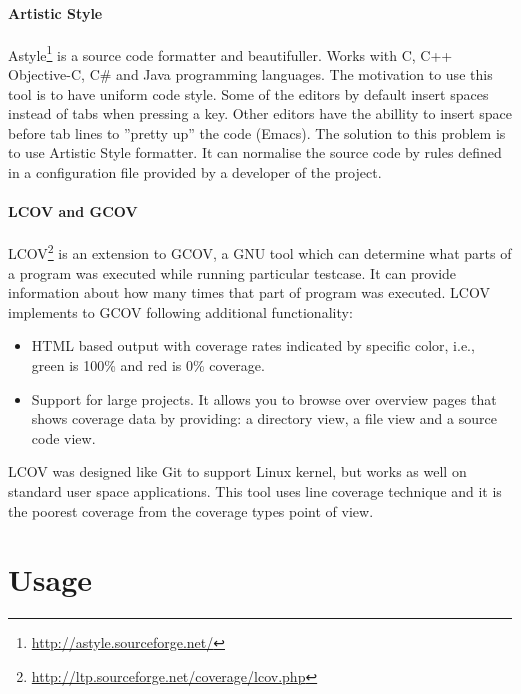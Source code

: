 \paragraph{Artistic Style}
Astyle\footnote{\url{http://astyle.sourceforge.net/}} is a source code formatter and beautifuller.
Works with C, C++ Objective-C, C\# and Java programming languages.
The motivation to use this tool is to have uniform code style.
Some of the editors by default insert spaces instead of tabs when pressing a key.
Other editors have the abillity to insert space before tab lines to ''pretty up'' the code (Emacs).
The solution to this problem is to use Artistic Style formatter.
It can normalise the source code by rules defined in a configuration file provided by a developer of the project.

\paragraph{LCOV and GCOV}
LCOV\footnote{\url{http://ltp.sourceforge.net/coverage/lcov.php}} is an extension to GCOV, a GNU tool which can determine what parts of a program was executed while running particular testcase.
It can provide information about how many times that part of program was executed.
LCOV implements to GCOV following additional functionality:
\begin{itemize}
	\item HTML based output with coverage rates indicated by specific color, i.e., green is 100\% and red is 0\% coverage.
	\item Support for large projects. It allows you to browse over overview pages that shows coverage data
	by providing: a directory view, a file view and a source code view.
\end{itemize}
LCOV was designed like Git to support Linux kernel, but works as well on standard user space applications.
This tool uses line coverage technique and it is the poorest coverage from the coverage types point of view.


\section{Usage}

%

